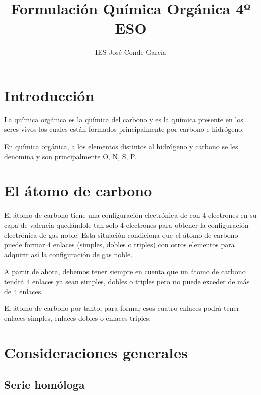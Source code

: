 \documentclass[11pt]{article}
\title{\textbf{\Huge{Formulación Química Orgánica 4º ESO}}}
\author{IES José Conde García}
\date{}
\begin{document}
\maketitle


\tableofcontents

\newpage{}

\myemptypage{}


\newpage

\section{Introducción}

La química orgánica es la química del carbono y es la química presente en los seres vivos los cuales están formados principalmente por carbono e hidrógeno.

En química orgánica, a los elementos distintos al hidrógeno y carbono se les denomina  y son principalmente O, N, S, P.

\section{El átomo de carbono}

El átomo de carbono tiene una configuración electrónica de  con 4 electrones en su capa de valencia quedándole tan solo 4 electrones para obtener la configuración electrónica de gas noble. Esta situación condiciona  que el átomo de carbono puede formar 4 enlaces (simples, dobles o triples) con otros elementos para adquirir así la configuración de gas noble. 

A partir de ahora, debemos tener siempre en cuenta que un átomo de carbono tendrá 4 enlaces ya sean simples, dobles o triples pero no puede exceder de más de 4 enlaces.

El átomo de carbono por tanto, para formar esos cuatro enlaces podrá tener enlaces simples, enlaces dobles o enlaces triples.

\section{Consideraciones generales}

\subsection{Serie homóloga}
\end{document}
